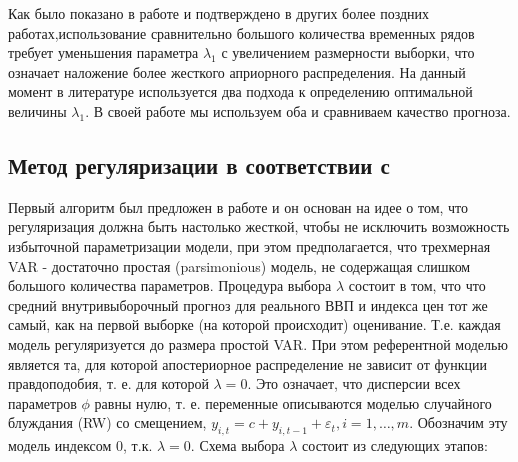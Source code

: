 \documentclass[11pt]{article} %
\begin{document}
Как было показано в работе \cite{demol_al_2008} и подтверждено в других более поздних работах,использование сравнительно большого количества временных рядов требует уменьшения параметра $\lambda_1$ с увеличением размерности выборки, что означает наложение более жесткого априорного распределения. На данный момент в литературе используется два подхода к определению оптимальной величины $\lambda_1$. В своей работе мы используем оба и сравниваем качество прогноза.

\subsection{Метод регуляризации в соответствии с \cite{banbura_al_2010}}

Первый алгоритм был предложен в работе \cite{banbura_al_2010} и он основан на идее о том, что регуляризация должна быть настолько жесткой, чтобы не исключить возможность избыточной параметризации модели, при этом предполагается, что трехмерная VAR - достаточно простая (parsimonious) модель, не содержащая слишком большого количества параметров. Процедура выбора $\lambda$ состоит в том, что что средний внутривыборочный прогноз для реального ВВП и индекса цен тот же самый, как на первой выборке (на которой происходит) оценивание. Т.е. каждая модель регуляризуется до размера простой VAR. При этом  референтной моделью является та, для которой апостериорное распределение не зависит от функции правдоподобия, т. е. для которой $\lambda=0$. Это означает, что дисперсии всех параметров $\phi$ равны нулю, т. е. переменные описываются моделью случайного блуждания (RW) со смещением, $y_{i,t}=c+y_{i,t-1} +\varepsilon_t, i=1,\ldots,m$. Обозначим эту модель индексом 0,  т.к. $\lambda=0$.
Схема выбора $\lambda$ состоит из следующих этапов:
\end{document}
